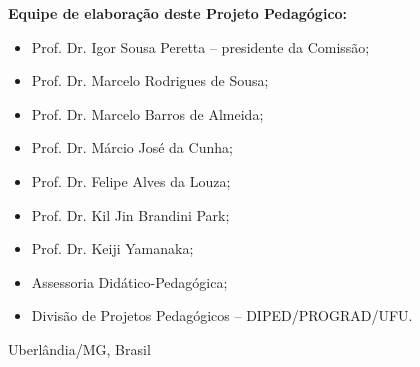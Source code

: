 \vfill


\textbf{Equipe de elaboração deste Projeto Pedagógico:}
\vspace*{-5mm}
\begin{itemize}
    \setlength\itemsep{-2em}
    \item Prof. Dr. Igor Sousa Peretta -- presidente da Comissão;
    \item Prof. Dr. Marcelo Rodrigues de Sousa;
    \item Prof. Dr. Marcelo Barros de Almeida;
    \item Prof. Dr. Márcio José da Cunha;
    \item Prof. Dr. Felipe Alves da Louza;
    \item Prof. Dr. Kil Jin Brandini Park;
    \item Prof. Dr. Keiji Yamanaka;
    \item Assessoria Didático-Pedagógica;
    \item Divisão de Projetos Pedagógicos -- DIPED/PROGRAD/UFU.
\end{itemize}


\vfill

\centerline{Uberlândia/MG, Brasil \the\year}



